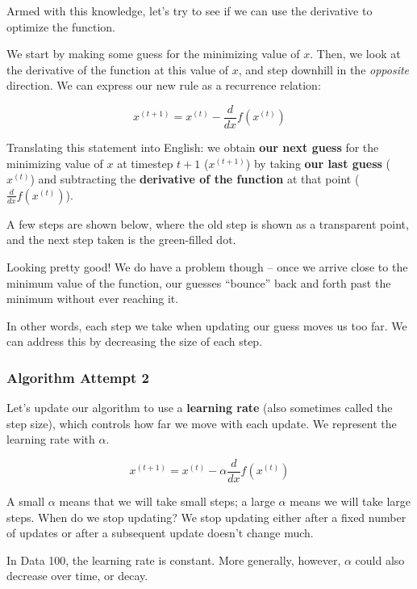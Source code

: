 \documentclass[
  letterpaper,
  DIV=11,
  numbers=noendperiod]{scrreprt}
\begin{document}
Armed with this knowledge, let's try to see if we can use the derivative
to optimize the function.

We start by making some guess for the minimizing value of \(x\). Then,
we look at the derivative of the function at this value of \(x\), and
step downhill in the \emph{opposite} direction. We can express our new
rule as a recurrence relation:

\[x^{(t+1)} = x^{(t)} - \frac{d}{dx} f(x^{(t)})\]

Translating this statement into English: we obtain \textbf{our next
guess} for the minimizing value of \(x\) at timestep \(t+1\)
(\(x^{(t+1)}\)) by taking \textbf{our last guess} (\(x^{(t)}\)) and
subtracting the \textbf{derivative of the function} at that point
(\(\frac{d}{dx} f(x^{(t)})\)).

A few steps are shown below, where the old step is shown as a
transparent point, and the next step taken is the green-filled dot.

Looking pretty good! We do have a problem though -- once we arrive close
to the minimum value of the function, our guesses ``bounce'' back and
forth past the minimum without ever reaching it.

In other words, each step we take when updating our guess moves us too
far. We can address this by decreasing the size of each step.

\subsubsection{Algorithm Attempt 2}\label{algorithm-attempt-2}

Let's update our algorithm to use a \textbf{learning rate} (also
sometimes called the step size), which controls how far we move with
each update. We represent the learning rate with \(\alpha\).

\[x^{(t+1)} = x^{(t)} - \alpha \frac{d}{dx} f(x^{(t)})\]

A small \(\alpha\) means that we will take small steps; a large
\(\alpha\) means we will take large steps. When do we stop updating? We
stop updating either after a fixed number of updates or after a
subsequent update doesn't change much.

\begin{tcolorbox}[enhanced jigsaw, titlerule=0mm, bottomtitle=1mm, arc=.35mm, colframe=quarto-callout-note-color-frame, rightrule=.15mm, opacityback=0, opacitybacktitle=0.6, leftrule=.75mm, breakable, toprule=.15mm, colback=white, left=2mm, colbacktitle=quarto-callout-note-color!10!white, toptitle=1mm, bottomrule=.15mm, title=\textcolor{quarto-callout-note-color}{\faInfo}\hspace{0.5em}{Note}, coltitle=black]

In Data 100, the learning rate is constant. More generally, however,
\(\alpha\) could also decrease over time, or decay.

\end{tcolorbox}
\end{document}
